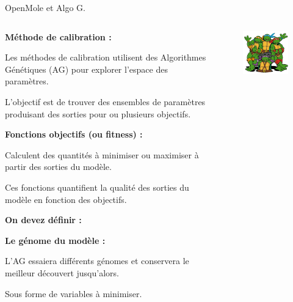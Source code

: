 \documentclass[newPxFont]{beamer}
\begin{document}
\begin{frame}[c]{OpenMole et Algo G.}
  \vspace{-1cm}
  \begin{columns}[onlytextwidth,T]
    \column{\dimexpr\linewidth-30mm-5mm}
    \begin{itemize}
      {\footnotesize
      \item \textbf{Méthode de calibration :}
      \begin{itemize}
        { \scriptsize
          \item Les méthodes de calibration utilisent des Algorithmes Génétiques (AG) pour explorer l’espace des paramètres.
          \item L’objectif est de trouver des ensembles de paramètres produisant des sorties pour ou plusieurs objectifs.
        }
      \end{itemize}
      
      \item \textbf{Fonctions objectifs (ou fitness) :}
      \begin{itemize}
        { \scriptsize
          \item Calculent des quantités à minimiser ou maximiser à partir des sorties du modèle.
          \item Ces fonctions quantifient la qualité des sorties du modèle en fonction des objectifs.
        }
      \end{itemize}
      
      \item \textbf{On devez définir :}
      \begin{itemize}
        {\footnotesize
          \item \textbf{Le génome du modèle :} 
          \begin{itemize}
            { \scriptsize
              \item L’AG essaiera différents génomes et conservera le meilleur découvert jusqu’alors.
              \item Sous forme de variables à minimiser.
            }
          \end{itemize}
        }
      \end{itemize}
      }
  \end{itemize}
  
    \column{30mm}
    \begin{figure}
      \includegraphics[width=4cm]{img/tortueNJ.png}
    \end{figure}
  \end{columns}
\end{frame}
\end{document}

